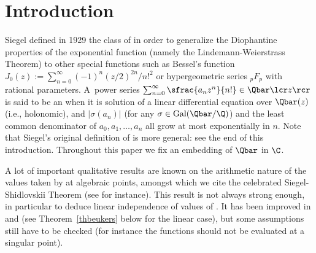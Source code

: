 
\section{Introduction}
Siegel \cite{siegel} defined in 1929 the class of \Efunctions in order to generalize the Diophantine properties of the exponential function (namely the Lindemann-Weierstrass Theorem) to other special functions such as Bessel's function $J_0(z):=\sum_{n=0}^\infty (-1)^n(z/2)^{2n}/n!^2$ or hypergeometric series ${}_pF_p$ with rational parameters.
A~power series $\sum_{n=0}^\infty \sfrac{a_nz^n}{n!}  \in \Qbar\lcr z\rcr$ is said to be an \Efunction when it is solution of a linear differential equation over $\Qbar(z)$ (i.e., holonomic),
and $\vert \sigma(a_n)\vert$ (for any $\sigma\in \textup{Gal}(\Qbar/\Q)$) and the least common denominator of $a_0, a_1, \ldots, a_n$ all grow at most exponentially in $n$. Note that Siegel's original definition of \Efunctions is more general: see the end of this introduction.
Throughout this paper we fix an embedding of $\Qbar $ in $\C$.

A lot of important qualitative results are known on the arithmetic nature of the values taken by \Efunctions at algebraic points, amongst which we cite the celebrated Siegel-Shidlovskii Theorem (see \cite{Shidlovskiilivre} for instance). This result is not always strong enough, in particular to deduce linear independence of values of \Efunctions. It has been improved in \cite{ns} and \cite{beukers} (see Theorem~\ref{thbeukers} below for the linear case), but some assump\-tions still have to be checked (for instance the functions should not be
evaluated at a singular point).

